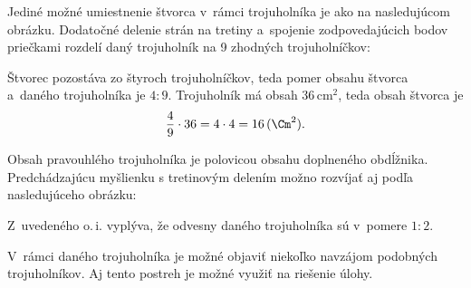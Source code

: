 {%
Jediné možné umiestnenie štvorca v~rámci trojuholníka je ako na nasledujúcom obrázku.
Dodatočné delenie strán na tretiny a~spojenie zodpovedajúcich bodov priečkami rozdelí daný trojuholník na 9 zhodných trojuholníčkov:
%


Štvorec pozostáva zo štyroch trojuholníčkov, teda pomer obsahu štvorca a~daného trojuholníka je $4:9$.
Trojuholník má obsah 36\,cm$^2$, teda obsah štvorca je
$$
\frac49\cdot36 =4\cdot4 =16\,(\Cm^2).
$$

\poznamky
Obsah pravouhlého trojuholníka je polovicou obsahu doplneného obdĺžnika.
Predchádzajúcu myšlienku s tretinovým delením možno rozvíjať aj podľa nasledujúceho obrázku:
%


Z~uvedeného o.\,i. vyplýva, že odvesny daného trojuholníka sú v~pomere $1:2$.

V~rámci daného trojuholníka je možné objaviť niekoľko navzájom podobných trojuholníkov.
Aj tento postreh je možné využiť na riešenie úlohy.
}

